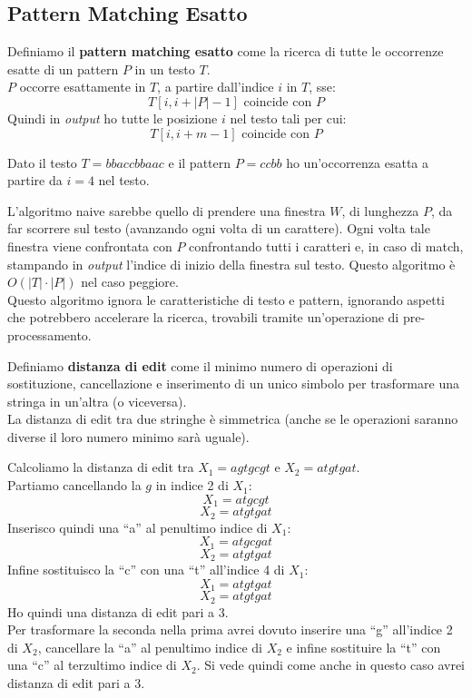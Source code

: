\subsection{Pattern Matching Esatto}
\begin{definizione}
  Definiamo il \textbf{pattern matching esatto} come la ricerca di tutte le
  occorrenze esatte di un pattern $P$ in un testo $T$.\\
  $P$ occorre esattamente in $T$, a partire dall'indice $i$ in $T$, sse:
  \[T[i,i+|P|-1]\mbox{ coincide con }P\]
  Quindi in \textit{output} ho tutte le posizione $i$ nel testo tali per cui:
  \[T[i,i+m-1]\mbox{ coincide con }P\]
\end{definizione}
\begin{esempio}
  Dato il testo $T=bbaccbbaac$ e il pattern $P=ccbb$ ho un'occorrenza esatta a
  partire da $i=4$ nel testo.
\end{esempio}
L'algoritmo naive sarebbe quello di prendere una finestra $W$, di lunghezza $P$,
da far scorrere sul testo (avanzando ogni volta di un carattere). Ogni volta
tale finestra viene confrontata con $P$ confrontando tutti i caratteri e, in
caso di match, stampando in \textit{output} l'indice di inizio della finestra sul
testo. Questo algoritmo è $O(|T|\cdot |P|)$ nel caso peggiore.\\ 
Questo algoritmo ignora le caratteristiche di testo e pattern, ignorando aspetti
che potrebbero accelerare la ricerca, trovabili tramite un'operazione di
pre-processamento.
\begin{definizione}
  Definiamo \textbf{distanza di edit} come il minimo numero di operazioni di
  sostituzione, cancellazione e inserimento di un unico simbolo per trasformare
  una stringa in un'altra (o viceversa). \\
  La distanza di edit tra due stringhe è simmetrica (anche se le operazioni
  saranno diverse il loro numero minimo sarà uguale).
\end{definizione}
\begin{esempio}
  Calcoliamo la distanza di edit tra $X_1=agtgcgt$ e $X_2=atgtgat$.\\
  Partiamo cancellando la $g$ in indice 2 di $X_1$:
  \[X_1=atgcgt\]
  \[X_2=atgtgat\]
  Inserisco quindi una ``a'' al penultimo indice di $X_1$:
  \[X_1=atgcgat\]
  \[X_2=atgtgat\]
  Infine sostituisco la ``c'' con una ``t'' all'indice 4 di $X_1$:
  \[X_1=atgtgat\]
  \[X_2=atgtgat\]
  Ho quindi una distanza di edit pari a 3.\\
  Per trasformare la seconda nella prima avrei dovuto inserire una ``g''
  all'indice 2 di $X_2$, cancellare la ``a'' al penultimo indice di $X_2$ e
  infine sostituire la ``t'' con una ``c'' al terzultimo indice di $X_2$. Si
  vede quindi come anche in questo caso avrei distanza di edit pari a 3.
\end{esempio}
